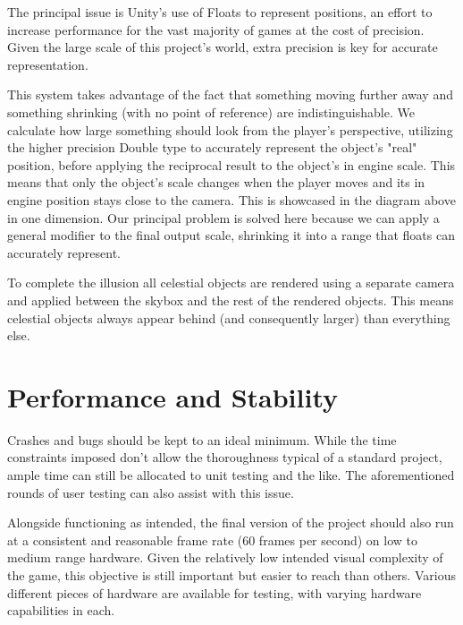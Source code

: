 \documentclass{report}
\begin{document}
The principal issue is Unity's use of Floats to represent positions, an effort to increase performance for the vast majority of games at the cost of precision. Given the large scale of this project's world, extra precision is key for accurate representation. 

This system takes advantage of the fact that something moving further away and something shrinking (with no point of reference) are indistinguishable. We calculate how large something should look from the player's perspective, utilizing the higher precision Double type to accurately represent the object's "real" position, before applying the reciprocal result to the object's in engine scale. This means that only the object's scale changes when the player moves and its in engine position stays close to the camera. This is showcased in the diagram above in one dimension. Our principal problem is solved here because we can apply a general modifier to the final output scale, shrinking it into a range that floats can accurately represent.

 To complete the illusion all celestial objects are rendered using a separate camera and applied between the skybox and the rest of the rendered objects. This means celestial objects always appear behind (and consequently larger) than everything else.

\section{Performance and Stability}

Crashes and bugs should be kept to an ideal minimum. While the time constraints imposed don't allow the thoroughness typical of a standard project, ample time can still be allocated to unit testing and the like. The aforementioned rounds of user testing can also assist with this issue.

Alongside functioning as intended, the final version of the project should also run at a consistent and reasonable frame rate (60 frames per second) on low to medium range hardware. Given the relatively low intended visual complexity of the game, this objective is still important but easier to reach than others. Various different pieces of hardware are available for testing, with varying hardware capabilities in each.
\end{document}
